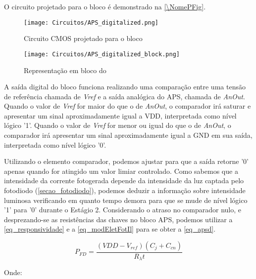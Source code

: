 O circuito projetado para o bloco \'e demonstrado na \autoref{\NomePFig}.

\begin{figure}[!h]
 \centering
    \centering
    \caption{Circuito CMOS projetado para o bloco \NomeBloco} 
    \texttt{[image: Circuitos/APS\_digitalized.png]}
    \label{\NomePFig}
\end{figure}

\begin{figure}[!h]
 \centering
    \centering
    \caption{\label{\NomeSFig}Representação em bloco do \NomeBloco}
    \texttt{[image: Circuitos/APS\_digitalized\_block.png]}
\end{figure}

A sa\'ida digital do bloco funciona realizando uma comparação entre uma tensão de refer\^encia chamada de \textit{Vref} e a sa\'ida anal\'ogica do APS, chamada de \textit{AnOut}. Quando o valor de \textit{Vref} for maior do que o de \textit{AnOut}, o comparador ir\'a saturar e apresentar um sinal aproximadamente igual a VDD, interpretada como n\'ivel l\'ogico '1'. Quando o valor de \textit{Vref} for menor ou igual do que o de \textit{AnOut}, o comparador ir\'a apresentar um sinal aproximadamente igual a GND em sua sa\'ida, interpretada como n\'ivel l\'ogico '0'.

Utilizando o elemento comparador, podemos ajustar para que a sa\'ida retorne '0' apenas quando for atingido um valor limiar controlado. Como sabemos que a intensidade da corrente fotogerada depende da intensidade da luz captada pelo fotodiodo (\autoref{secao_fotodiodo}), podemos deduzir a informação sobre intensidade luminosa verificando em quanto tempo demora para que se mude de n\'ivel l\'ogico '1' para '0' durante o Est\'agio 2. Considerando o atraso no comparador nulo, e desprezando-se as resistências das chaves no bloco APS, podemos utilizar a \autoref{eq_responsividade} e a \autoref{eq_modEletFotIl} para se obter a \autoref{eq_apsd}.

\begin{equation}
    \label{eq_apsd}
    P_{FD} = \frac{(VDD-V_{ref})(C_{j}+C_{cn})}{R_{\lambda}t}
\end{equation}

Onde:

